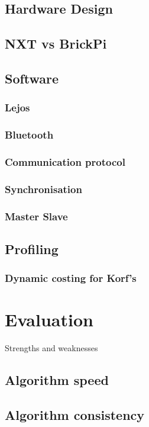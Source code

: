 \documentclass[titlepage]{report}[12pt]
\begin{document}
\subsection{Hardware Design}
\subsection{NXT vs BrickPi}

\subsection{Software}
\subsubsection{Lejos}
\subsubsection{Bluetooth}
\subsubsection{Communication protocol}
\subsubsection{Synchronisation}
\subsubsection{Master Slave}
\subsection{Profiling}
\subsubsection{Dynamic costing for Korf's}

\section{Evaluation}

Strengths and weaknesses
\subsection{Algorithm speed}
\subsection{Algorithm consistency}
\end{document}
